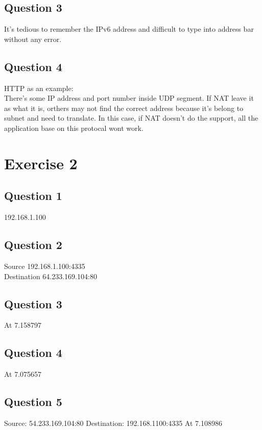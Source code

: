 \documentclass{article}
\begin{document}
\subsection{Question 3}

It's tedious to remember the IPv6 address and difficult to type into address bar without 
any error.

\subsection{Question 4}

HTTP as an example: \\
There's some IP address and port number inside UDP segment. If NAT leave it as what it is,
orthers may not find the correct address because it's belong to subnet and need to translate.
In this case, if NAT doesn't do the support, all the application base on this protocal wont
work.

\section{Exercise 2}

\subsection{Question 1}

192.168.1.100

\subsection{Question 2}

Source 192.168.1.100:4335\\
Destination  64.233.169.104:80

\subsection{Question 3}

At 7.158797

\subsection{Question 4}

At 7.075657

\subsection{Question 5}

Source: 54.233.169.104:80
Destination: 192.168.1100:4335
At 7.108986 
\end{document}
